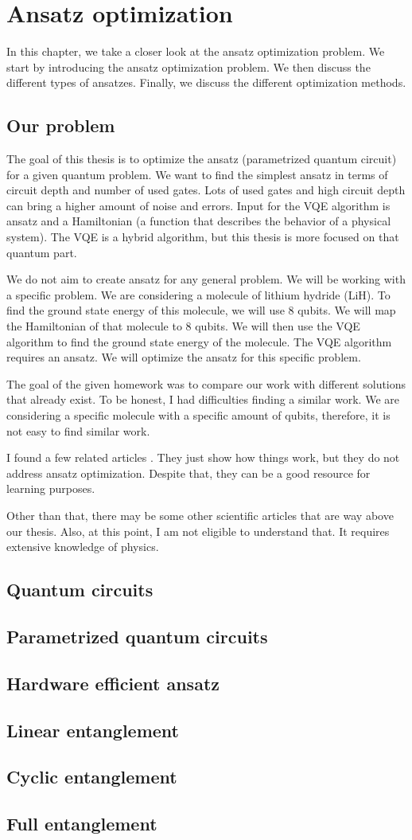 \chapter{Ansatz optimization}\label{ch:ansatz}
In this chapter, we take a closer look at the ansatz optimization problem. We start by introducing the ansatz optimization problem. We then discuss the different types of ansatzes. Finally, we discuss the different optimization methods.
\section{Our problem}
The goal of this thesis is to optimize the ansatz (parametrized quantum circuit) for a given quantum problem. We want to find the simplest ansatz in terms of circuit depth and number of used gates. Lots of used gates and high circuit depth can bring a higher amount of noise and errors. Input for the VQE algorithm is ansatz and a Hamiltonian (a function that describes the behavior of a physical system). The VQE is a hybrid algorithm, but this thesis is more focused on that quantum part.

We do not aim to create ansatz for any general problem. We will be working with a specific problem. We are considering a molecule of lithium hydride (LiH). To find the ground state energy of this molecule, we will use 8 qubits. We will map the Hamiltonian of that molecule to 8 qubits. We will then use the VQE algorithm to find the ground state energy of the molecule. The VQE algorithm requires an ansatz. We will optimize the ansatz for this specific problem. 

The goal of the given homework was to compare our work with different solutions that already exist. To be honest, I had difficulties finding a similar work. We are considering a specific molecule with a specific amount of qubits, therefore, it is not easy to find similar work.

I found a few related articles \cite{linkedin, medium, innostation}. They just show how things work, but they do not address ansatz optimization. Despite that, they can be a good resource for learning purposes.

Other than that, there may be some other scientific articles that are way above our thesis. Also, at this point, I am not eligible to understand that. It requires extensive knowledge of physics.

\section{Quantum circuits}
\section{Parametrized quantum circuits}
\section{Hardware efficient ansatz}
\section{Linear entanglement}
\section{Cyclic entanglement}
\section{Full entanglement}


